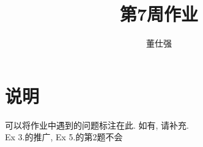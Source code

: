 \documentclass[11pt]{ctexart}
\title{第7周作业}
\author{董仕强}
\theoremstyle{definition}
\numberwithin{equation}{section}
\begin{document}
\maketitle

\section{说明}

可以将作业中遇到的问题标注在此. 如有, 请补充.\\
Ex 3.的推广, Ex 5.的第2题不会

\tableofcontents

\newpage

\end{document}
